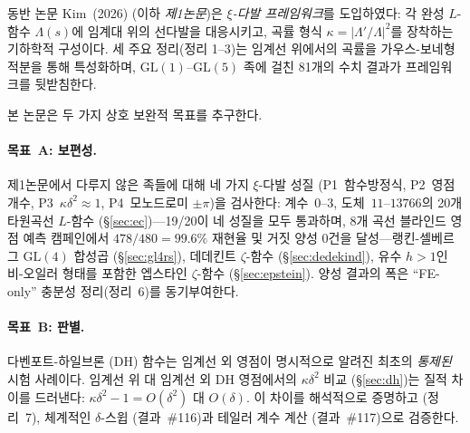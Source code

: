 \documentclass[11pt, a4paper]{article}
\theoremstyle{plain}
\theoremstyle{definition}
\begin{document}
동반 논문 Kim~(2026) (이하 \textit{제1논문})은
\emph{$\xi$-다발 프레임워크}를 도입하였다:
각 완성 $L$-함수 $\Lambda(s)$에 임계대 위의 선다발을 대응시키고,
곡률 형식 $\kappa = |\Lambda'/\Lambda|^{2}$를 장착하는 기하학적 구성이다.
세 주요 정리(정리 1--3)는 임계선 위에서의 곡률을
가우스-보네형 적분을 통해 특성화하며,
$\mathrm{GL}(1)$--$\mathrm{GL}(5)$ 족에 걸친
81개의 수치 결과가 프레임워크를 뒷받침한다.

본 논문은 두 가지 상호 보완적 목표를 추구한다.

\paragraph{목표~A: 보편성.}
제1논문에서 다루지 않은 족들에 대해
네 가지 $\xi$-다발 성질 (P1~함수방정식, P2~영점 개수,
P3~$\kappa\delta^{2}\approx 1$, P4~모노드로미 $\pm\pi$)을 검사한다:
계수~$0$--$3$, 도체~$11$--$13766$의 20개 타원곡선 $L$-함수
(\S\ref{sec:ec})---19/20이 네 성질을 모두 통과하며,
8개 곡선 블라인드 영점 예측 캠페인에서
$478/480 = 99.6\%$ 재현율 및 거짓 양성 0건을 달성---랭킨-셀베르그 $\mathrm{GL}(4)$ 합성곱
(\S\ref{sec:gl4rs}), 데데킨트 $\zeta$-함수 (\S\ref{sec:dedekind}),
유수 $h>1$인 비-오일러 형태를 포함한 엡스타인 $\zeta$-함수
(\S\ref{sec:epstein}).
양성 결과의 폭은 ``FE-only'' 충분성 정리(정리~6)를 동기부여한다.

\paragraph{목표~B: 판별.}
다벤포트-하일브론 (DH) 함수는 임계선 외 영점이
명시적으로 알려진 최초의 \emph{통제된} 시험 사례이다.
임계선 위 대 임계선 외 DH 영점에서의 $\kappa\delta^{2}$ 비교
(\S\ref{sec:dh})는 질적 차이를 드러낸다:
$\kappa\delta^{2}-1 = O(\delta^{2})$ 대 $O(\delta)$.
이 차이를 해석적으로 증명하고 (정리~7),
체계적인 $\delta$-스윕 (결과~\#116)과
테일러 계수 계산 (결과~\#117)으로 검증한다.
\end{document}
